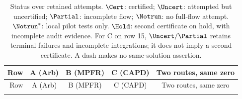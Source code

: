 \begin{longtable}{@{}rcccc@{}}
\toprule
Row & A (Arb) & B (MPFR) & C (CAPD) & Two routes, same zero\\
\midrule
\endfirsthead
\toprule
Row & A (Arb) & B (MPFR) & C (CAPD) & Two routes, same zero\\
\midrule
\endhead
\bottomrule
\caption{Status over retained attempts. $\Cert$: certified;
$\Uncert$: attempted but uncertified; $\Partial$: incomplete flow;
$\Notrun$: no full-flow attempt. $\Notrun^{*}$: local pilot tests only.
$\Hold$: second certificate on hold, with incomplete audit evidence.
For C on row 15, $\Uncert/\Partial$ retains terminal failures and
incomplete integrations; it does not imply a second certificate. A dash makes no
same-solution assertion.}
\label{tab:rows}
\end{longtable}

